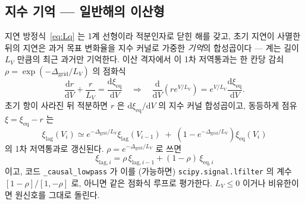 \documentclass[11pt,a4paper]{article}
\newcommand{\dd}{\mathrm{d}}
\newcommand{\eq}{\mathrm{eq}}
\newcommand{\code}[1]{\texttt{#1}}
\begin{document}
\subsection{지수 기억 — 일반해의 이산형}
지연 방정식~\eqref{eq:Lq} 는 1계 선형이라 적분인자로 닫힌 해를 갖고, 초기 지연이 사멸한 뒤의 지연은 과거 목표 변화율을
지수 커널로 가중한 \emph{기억}의 합성곱이다 — 계는 길이 $L_{V}$ 만큼의 최근 과거만 기억한다. 이산 격자에서 이 1차
저역통과는 한 칸당 감쇠 $\rho=\exp(-\Delta_\mathrm{grid}/L_V)$ 의 점화식
\begin{equation}
\frac{\dd r}{\dd V}+\frac{r}{L_V}=\frac{\dd\xi_\eq}{\dd V}
\quad\Longrightarrow\quad
\frac{\dd}{\dd V}\left(r e^{V/L_V}\right)=e^{V/L_V}\frac{\dd\xi_\eq}{\dd V}.
\label{eq:lowpassderiveA}
\end{equation}
초기 항이 사라진 뒤 적분하면 $r$ 은 $\dd\xi_\eq/\dd V$ 의 지수 커널 합성곱이고, 동등하게 점유 $\xi=\xi_\eq-r$ 는
\begin{equation}
\xi_{\mathrm{lag}}(V_i)
\simeq e^{-\Delta_\mathrm{grid}/L_V}\xi_{\mathrm{lag}}(V_{i-1})
\;+\;\left(1-e^{-\Delta_\mathrm{grid}/L_V}\right)\xi_\eq(V_i)
\label{eq:lowpassderiveB}
\end{equation}
의 1차 저역통과로 갱신된다. $\rho=e^{-\Delta_\mathrm{grid}/L_V}$ 로 쓰면
\begin{equation}
\xi_{\mathrm{lag},i}=\rho\,\xi_{\mathrm{lag},i-1}+(1-\rho)\,\xi_{\eq,i}
\label{eq:lowpass}
\end{equation}
이고, 코드 \code{\_causal\_lowpass} 가 이를 (가능하면) \code{scipy.signal.lfilter} 의 계수
$[1-\rho]/[1,-\rho]$ 로, 아니면 같은 점화식 루프로 평가한다. $L_V\le0$ 이거나 비유한이면 원신호를 그대로 돌린다.
\end{document}
